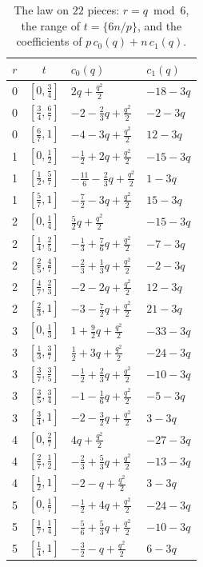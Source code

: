 \documentclass[11pt]{amsart}
\theoremstyle{definition}
\theoremstyle{remark}
\numberwithin{equation}{section}
\newcommand{\fr}[1]{\{#1\}}
\begin{document}
\begin{table}[ht]
\centering
\renewcommand{\arraystretch}{1.12}
\begin{tabular}{@{}ccll@{}}
\toprule
$r$ & $t$ & $c_0(q)$ & $c_1(q)$\\
\midrule
0&$[0,\frac34]$&$2q+\frac{q^2}2$&$-18-3q$\\
0&$[\frac34,\frac67]$&$-2-\frac23q+\frac{q^2}2$&$-2-3q$\\
0&$[\frac67,1]$&$-4-3q+\frac{q^2}2$&$12-3q$\\
1&$[0,\frac12]$&$-\frac12+2q+\frac{q^2}2$&$-15-3q$\\
1&$[\frac12,\frac57]$&$-\frac{11}6-\frac23q+\frac{q^2}2$&$1-3q$\\
1&$[\frac57,1]$&$-\frac72-3q+\frac{q^2}2$&$15-3q$\\
2&$[0,\frac14]$&$\frac52q+\frac{q^2}2$&$-15-3q$\\
2&$[\frac14,\frac25]$&$-\frac13+\frac76q+\frac{q^2}2$&$-7-3q$\\
2&$[\frac25,\frac47]$&$-\frac23+\frac13q+\frac{q^2}2$&$-2-3q$\\
2&$[\frac47,\frac23]$&$-2-2q+\frac{q^2}2$&$12-3q$\\
2&$[\frac23,1]$&$-3-\frac72q+\frac{q^2}2$&$21-3q$\\
3&$[0,\frac13]$&$1+\frac92q+\frac{q^2}2$&$-33-3q$\\
3&$[\frac13,\frac37]$&$\frac12+3q+\frac{q^2}2$&$-24-3q$\\
3&$[\frac37,\frac35]$&$-\frac12+\frac23q+\frac{q^2}2$&$-10-3q$\\
3&$[\frac35,\frac34]$&$-1-\frac16q+\frac{q^2}2$&$-5-3q$\\
3&$[\frac34,1]$&$-2-\frac32q+\frac{q^2}2$&$3-3q$\\
4&$[0,\frac27]$&$4q+\frac{q^2}2$&$-27-3q$\\
4&$[\frac27,\frac12]$&$-\frac23+\frac53q+\frac{q^2}2$&$-13-3q$\\
4&$[\frac12,1]$&$-2-q+\frac{q^2}2$&$3-3q$\\
5&$[0,\frac17]$&$-\frac12+4q+\frac{q^2}2$&$-24-3q$\\
5&$[\frac17,\frac14]$&$-\frac56+\frac53q+\frac{q^2}2$&$-10-3q$\\
5&$[\frac14,1]$&$-\frac32-q+\frac{q^2}2$&$6-3q$\\
\bottomrule
\end{tabular}
\caption{The law on $22$ pieces: $r=q\bmod6$, the range of $t=\fr{6n/p}$, and the coefficients of
$p\,c_0(q)+n\,c_1(q)$.}\label{tab:pieces}
\end{table}
\end{document}
